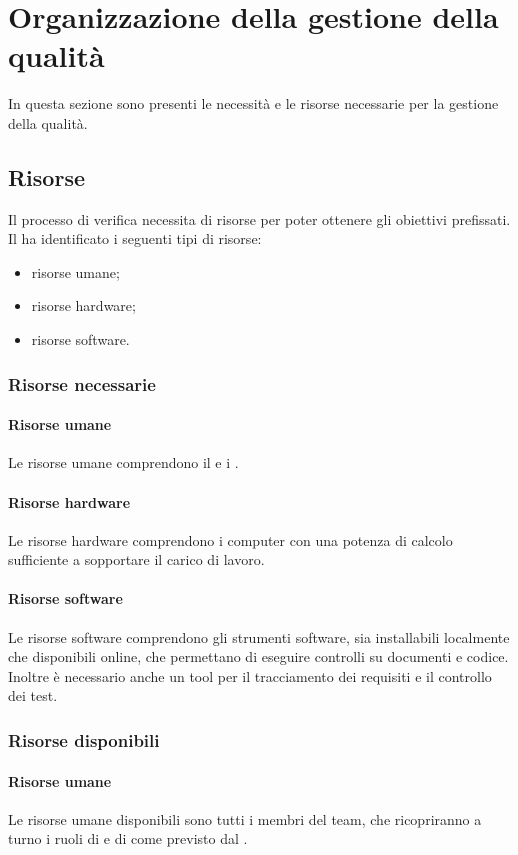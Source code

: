 \newpage



\section{Organizzazione della gestione della qualità}
		In questa sezione sono presenti le necessità e le risorse necessarie per la gestione della qualità.
		
		\subsection{Risorse}
			Il processo di verifica necessita di risorse per poter ottenere gli obiettivi prefissati. Il  ha identificato i seguenti tipi di risorse:
			\begin{itemize}
				\item risorse umane;
				\item risorse hardware;
				\item risorse software.
			\end{itemize}
			\subsubsection{Risorse necessarie}
				\paragraph{Risorse umane}
					Le risorse umane comprendono il \responsabilediprogetto{} e i \verificatori.
				\paragraph{Risorse hardware}
					Le risorse hardware comprendono i computer con una potenza di calcolo sufficiente a sopportare il carico di lavoro.
				\paragraph{Risorse software}
					Le risorse software comprendono gli strumenti software, sia installabili localmente che disponibili online, che permettano di eseguire controlli su documenti e codice.
					Inoltre è necessario anche un tool per il tracciamento dei requisiti e il controllo dei test.
			\subsubsection{Risorse disponibili}
				\paragraph{Risorse umane}
					Le risorse umane disponibili sono tutti i membri del team, che ricopriranno a turno i ruoli di \responsabilediprogetto{} e di \verificatore{} come previsto dal \pdpv.
